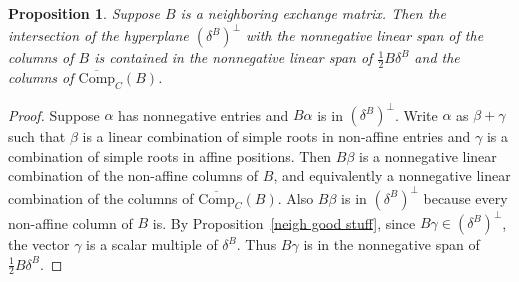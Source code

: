 \documentclass{amsart}
\newtheorem{proposition}{Proposition}[section]
\theoremstyle{definition}
\theoremstyle{remark}
\numberwithin{equation}{section}
\newcommand{\0}{{\mathbf{0}}}
\newcommand{\CompPlus}{\overline{\mathrm{Comp}}_C}
\begin{document}
\begin{proposition}\label{Comp span}
Suppose $B$ is a neighboring exchange matrix.
Then the intersection of the hyperplane $(\delta^B)^\perp$ with the nonnegative linear span of the columns of $B$ is contained in the nonnegative linear span of $\frac12B\delta^B$ and the columns of $\CompPlus(B)$.
\end{proposition}
\begin{proof}
Suppose $\alpha$ has nonnegative entries and $B\alpha$ is in $(\delta^B)^\perp$.
Write $\alpha$ as $\beta+\gamma$ such that $\beta$ is a linear combination of simple roots in non-affine entries and $\gamma$ is a combination of simple roots in affine positions.
Then $B\beta$ is a nonnegative linear combination of the non-affine columns of $B$, and equivalently a nonnegative linear combination of the columns of $\CompPlus(B)$.
Also $B\beta$ is in $(\delta^B)^\perp$ because every non-affine column of $B$ is.
By Proposition~\ref{neigh good stuff}, since $B\gamma\in(\delta^B)^\perp$, the vector $\gamma$ is a scalar multiple of $\delta^B$.
Thus $B\gamma$ is in the nonnegative span of $\frac12B\delta^B$.
\end{proof}
\end{document}
